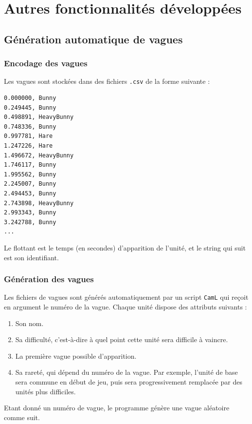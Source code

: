 \documentclass[a4paper,11pt]{article}
\begin{document}
\section{Autres fonctionnalités développées}

\subsection{Génération automatique de vagues}

\subsubsection*{Encodage des vagues}

Les vagues sont stockées dans des fichiers \texttt{.csv} de la forme suivante :

\begin{verbatim}
0.000000, Bunny
0.249445, Bunny
0.498891, HeavyBunny
0.748336, Bunny
0.997781, Hare
1.247226, Hare
1.496672, HeavyBunny
1.746117, Bunny
1.995562, Bunny
2.245007, Bunny
2.494453, Bunny
2.743898, HeavyBunny
2.993343, Bunny
3.242788, Bunny
...
\end{verbatim}

Le flottant est le temps (en secondes) d'apparition de l'unité, et le string qui suit est son identifiant. \newline

\subsubsection*{Génération des vagues}

Les fichiers de vagues sont générés automatiquement par un script \texttt{CamL} qui reçoit en argument le numéro de la vague. Chaque unité dispose des attributs suivants :

\begin{enumerate}
\item Son nom.
\item Sa difficulté, c'est-à-dire à quel point cette unité sera difficile à vaincre.
\item La première vague possible d'apparition.
\item Sa rareté, qui dépend du numéro de la vague. Par exemple, l'unité de base sera commune en début de jeu, puis sera progressivement remplacée par des unités plus difficiles.
\end{enumerate}

Etant donné un numéro de vague, le programme génère une vague aléatoire comme suit.
\end{document}
